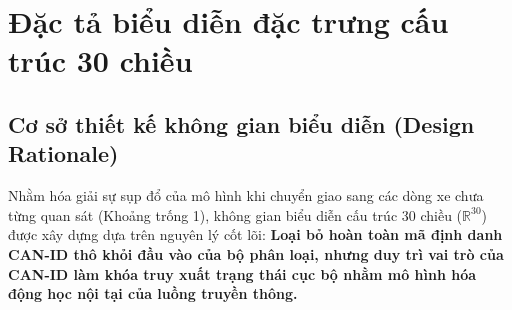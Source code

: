 \documentclass[12pt, a4paper, reqno, oneside]{book}
\begin{document}
\section{Đặc tả biểu diễn đặc trưng cấu trúc 30 chiều}\label{sec:structural-rep}

\subsection{Cơ sở thiết kế không gian biểu diễn (Design Rationale)}
Nhằm hóa giải sự sụp đổ của mô hình khi chuyển giao sang các dòng xe chưa từng quan sát (Khoảng trống 1), không gian biểu diễn cấu trúc 30 chiều ($\mathbb{R}^{30}$) được xây dựng dựa trên nguyên lý cốt lõi: \textbf{Loại bỏ hoàn toàn mã định danh CAN-ID thô khỏi đầu vào của bộ phân loại, nhưng duy trì vai trò của CAN-ID làm khóa truy xuất trạng thái cục bộ nhằm mô hình hóa động học nội tại của luồng truyền thông.}
\end{document}
